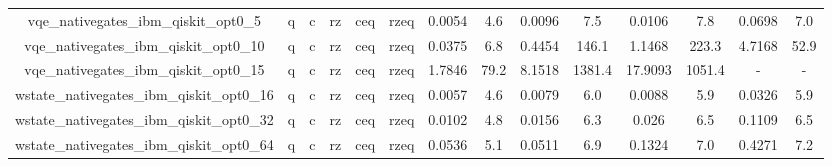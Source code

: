 \begin{table}[htb]
{\begin{tabular}{|c|c|c|c|c|c|c|c|c|c|c|c|c|c|}
vqe_nativegates_ibm_qiskit_opt0_5 & q & c & rz & ceq & rzeq & 0.0054 & 4.6 & 0.0096 & 7.5 & 0.0106 & 7.8 & 0.0698 & 7.0 \\ 
vqe_nativegates_ibm_qiskit_opt0_10 & q & c & rz & ceq & rzeq & 0.0375 & 6.8 & 0.4454 & 146.1 & 1.1468 & 223.3 & 4.7168 & 52.9 \\ 
vqe_nativegates_ibm_qiskit_opt0_15 & q & c & rz & ceq & rzeq & 1.7846 & 79.2 & 8.1518 & 1381.4 & 17.9093 & 1051.4 & - & - \\ 
wstate_nativegates_ibm_qiskit_opt0_16 & q & c & rz & ceq & rzeq & 0.0057 & 4.6 & 0.0079 & 6.0 & 0.0088 & 5.9 & 0.0326 & 5.9 \\ 
wstate_nativegates_ibm_qiskit_opt0_32 & q & c & rz & ceq & rzeq & 0.0102 & 4.8 & 0.0156 & 6.3 & 0.026 & 6.5 & 0.1109 & 6.5 \\ 
wstate_nativegates_ibm_qiskit_opt0_64 & q & c & rz & ceq & rzeq & 0.0536 & 5.1 & 0.0511 & 6.9 & 0.1324 & 7.0 & 0.4271 & 7.2 \\ 
\hline 
\end{tabular}} 
\end{table} 
